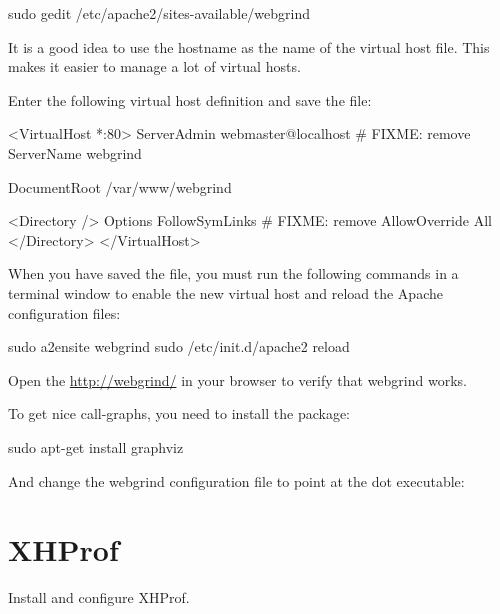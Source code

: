 \documentclass[final,ebook,10pt,twoside,openright]{memoir}
\begin{document}
\begin{squashboxcommand}
sudo gedit /etc/apache2/sites-available/webgrind
\end{squashboxcommand}

It is a good idea to use the hostname as the name of the virtual host file. This makes it easier to manage a lot of virtual hosts.

Enter the following virtual host definition and save the file:

\begin{squashboxoutput}
<VirtualHost *:80>
  ServerAdmin webmaster@localhost # FIXME: remove
  ServerName webgrind

  DocumentRoot /var/www/webgrind

  <Directory />
    Options FollowSymLinks # FIXME: remove
    AllowOverride All
  </Directory>
</VirtualHost>
\end{squashboxoutput}


When you have saved the file, you must run the following commands in a terminal window to enable the new virtual host and reload the Apache configuration files:

\begin{squashboxcommand}
sudo a2ensite webgrind
sudo /etc/init.d/apache2 reload
\end{squashboxcommand}

Open the \url{http://webgrind/} in your browser to verify that webgrind works.

  To get nice call-graphs, you need to install the package:

\begin{squashboxcommand}
sudo apt-get install graphviz
\end{squashboxcommand}

And change the webgrind configuration file to point at the dot executable:



\section{XHProf}
\label{sec:XHProf}

Install and configure XHProf.
\end{document}
